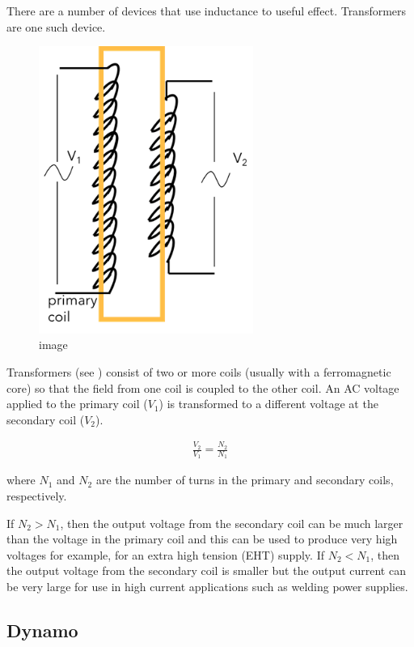\documentclass[
]{book}
\begin{document}
There are a number of devices that use inductance to useful effect.
Transformers are one such device.

\begin{figure}
\centering
\includegraphics[width=70mm,height=\textheight]{Figures/transformers.png}
\caption{image}
\end{figure}

Transformers (see ) consist of two or more coils (usually with a
ferromagnetic core) so that the field from one coil is coupled to the
other coil. An AC voltage applied to the primary coil (\(V_1\)) is
transformed to a different voltage at the secondary coil (\(V_2\)).

\[\begin{aligned}
\frac{V_2}{V_1} = \frac{N_2}{N_1}
\end{aligned}\]

where \(N_1\) and \(N_2\) are the number of turns in the primary and
secondary coils, respectively.

If \(N_2 > N_1\), then the output voltage from the secondary coil can be
much larger than the voltage in the primary coil and this can be used to
produce very high voltages for example, for an extra high tension (EHT)
supply. If \(N_2 < N_1\), then the output voltage from the secondary coil
is smaller but the output current can be very large for use in high
current applications such as welding power supplies.

\hypertarget{dynamo}{%
\subsection{Dynamo}\label{dynamo}}
\end{document}
